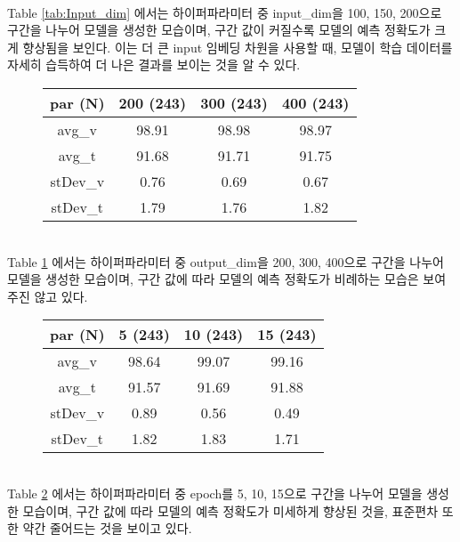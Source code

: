 \documentclass{jcse}
\begin{document}
\\Table \ref{tab:Input_dim} 에서는 하이퍼파라미터 중 input\_dim을 100, 150, 200으로 구간을 나누어 모델을 생성한 모습이며, 구간 값이 커질수록 모델의 예측 정확도가 크게 향상됨을 보인다. 이는 더 큰 input 임베딩 차원을 사용할 때, 모델이 학습 데이터를 자세히 습득하여 더 나은 결과를 보이는 것을 알 수 있다.
\\
\begin{figure}[ht]
\begin{minipage}{\linewidth}
\centering
{}
\label{tab:Output_dim}
\begin{tabular}{cccc}
\hline
par (N) & 200 (243) & 300 (243) & 400 (243) \\
\hline
avg\_v  & 98.91 & 98.98 & 98.97  \\
avg\_t  & 91.68 & 91.71 & 91.75  \\
stDev\_v & 0.76 & 0.69 & 0.67 \\
stDev\_t & 1.79 & 1.76 & 1.82 \\
\hline
\end{tabular}
\end{minipage}
\end{figure}
\\Table \ref{tab:Output_dim} 에서는 하이퍼파라미터 중 output\_dim을 200, 300, 400으로 구간을 나누어 모델을 생성한 모습이며, 구간 값에 따라 모델의 예측 정확도가 비례하는 모습은 보여주진 않고 있다.
\\
\begin{figure}[ht]
\begin{minipage}{\linewidth}
\centering
{}
\label{tab:Epochs}
\begin{tabular}{cccc}
\hline
par (N) & 5 (243) & 10 (243) & 15 (243) \\
\hline
avg\_v  & 98.64 & 99.07 & 99.16  \\
avg\_t  & 91.57 & 91.69 & 91.88  \\
stDev\_v & 0.89 & 0.56 & 0.49 \\
stDev\_t & 1.82 & 1.83 & 1.71 \\
\hline
\end{tabular}
\end{minipage}
\end{figure}
\\Table \ref{tab:Epochs} 에서는 하이퍼파라미터 중 epoch를 5, 10, 15으로 구간을 나누어 모델을 생성한 모습이며, 구간 값에 따라 모델의 예측 정확도가 미세하게 향상된 것을, 표준편차 또한 약간 줄어드는 것을 보이고 있다.
\\
\end{document}
